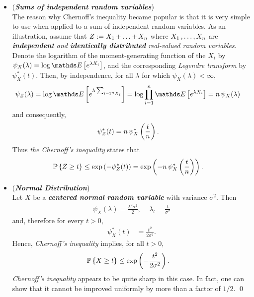\documentclass[11pt]{article}
\begin{document}
\begin{itemize}
\item \begin{remark}(\emph{\textbf{Sums of independent random variables}})\\
The reason why Chernoff's inequality became popular is that it is very simple to use when applied to a sum of independent random
variables. As an illustration, assume that $Z := X_1 \,{+}\ldots{+}\, X_n$ where $X_1 \,{,}\ldots{,}\, X_n$ are \emph{\textbf{independent} and \textbf{identically distributed} real-valued random variables}.  Denote the logarithm of the moment-generating function of the $X_i$ by $\psi_X(\lambda) = \log \E{}{e^{\lambda X_i}}$, and the corresponding \emph{Legendre transform} by $\psi_X^{*}(t)$. Then, by independence, for all $\lambda$ for which $\psi_X(\lambda) < \infty$,
\begin{align*}
\psi_Z(\lambda) &= \log \E{}{e^{\lambda\sum_{i=1^{n}X_i}}} = \log \prod_{i=1}^{n}\E{}{e^{\lambda X_i}}  = n\, \psi_{X}(\lambda)
\end{align*} and consequently,
\begin{align*}
\psi_Z^{*}(t) &= n\,\psi_{X}^{*}\left(\frac{t}{n}\right).
\end{align*} Thus \emph{the Chernoff's inequality} states that 
\begin{align*}
{\mathbb P}\left\{Z \ge t\right\} &\le \exp\left(-\psi^{*}_{Z}(t)\right) = \exp\left(-n\,\psi_{X}^{*}\left(\frac{t}{n}\right)\right).
\end{align*}
\end{remark}

\item \begin{example} (\emph{\textbf{Normal Distribution}})\\
Let $X$ be a \emph{\textbf{centered normal random variable}} with variance $\sigma^2$. Then
\begin{align*}
\psi_X(\lambda) = \frac{\lambda^2 \sigma^2}{2},\, \quad \lambda_t = \frac{t}{\sigma^2}
\end{align*} and, therefore for every $t > 0$, 
\begin{align*}
\psi_{X}^{*}(t) &= \frac{t^2}{2\sigma^2}.
\end{align*} Hence, \emph{Chernoff's inequality} implies, for all $t > 0$,
\begin{align*}
{\mathbb P}\left\{X \ge t\right\} &\le \exp\left(-\frac{t^2}{2\sigma^2}\right).
\end{align*} \emph{Chernoff's inequality} appears to be quite sharp in this case. In fact, one can show that it cannot be improved uniformly by more than a factor of $1/2$. \qed
\end{example}



\end{itemize}
\end{document}
